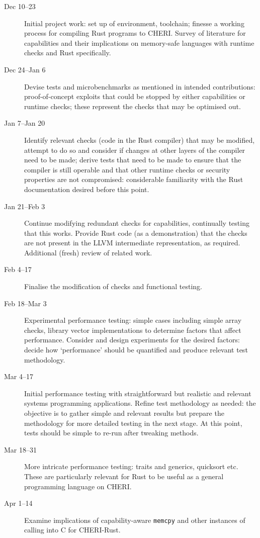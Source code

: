 \documentclass[11pt]{article}
\begin{document}
\begin{description}
  \item [Dec 10--23] Initial project work: set up of environment, toolchain; finesse a working process for compiling Rust programs to CHERI.
  Survey of literature for capabilities and their implications on memory-safe languages with runtime checks and Rust specifically.
  \item [Dec 24--Jan 6] Devise tests and microbenchmarks as mentioned in intended contributions: proof-of-concept exploits that could be stopped by either capabilities or runtime checks; these represent the checks that may be optimised out.
  \item [Jan 7--Jan 20] Identify relevant checks (code in the Rust compiler) that may be modified, attempt to do so and consider if changes at other layers of the compiler need to be made; derive tests that need to be made to ensure that the compiler is still operable and that other runtime checks or security properties are not compromised: considerable familiarity with the Rust documentation desired before this point.
  \item [Jan 21--Feb 3] Continue modifying redundant checks for capabilities, continually testing that this works.
  Provide Rust code (as a demonstration) that the checks are not present in the LLVM intermediate representation, as required.
  Additional (fresh) review of related work.
  \item [Feb 4--17]  Finalise the modification of checks and functional testing.
  \item [Feb 18--Mar 3] Experimental performance testing: simple cases including simple array checks, library vector implementations to determine factors that affect performance.
  Consider and design experiments for the desired factors: decide how `performance' should be quantified and produce relevant test methodology.
  \item [Mar 4--17] Initial performance testing with straightforward but realistic and relevant systems programming applications.
  Refine test methodology as needed: the objective is to gather simple and relevant results but prepare the methodology for more detailed testing in the next stage.
  At this point, tests should be simple to re-run after tweaking methods.
  \item [Mar 18--31] More intricate performance testing: traits and generics, quicksort etc.
  These are particularly relevant for Rust to be useful as a general programming language on CHERI.
  \item [Apr 1--14] Examine implications of capability-aware \texttt{memcpy} and other instances of calling into C for CHERI-Rust.

\end{description}
\end{document}
